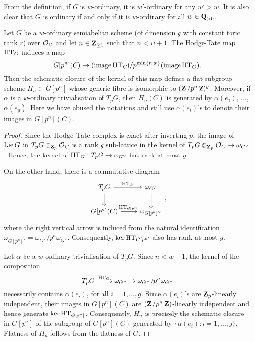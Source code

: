 \begin{Remark}\label{Remark: w-ordinary semiabelian schemes}
\normalfont From the definition, if $G$ is $w$-ordinary, it is $w'$-ordinary for any $w'>w$. It is also clear that $G$ is ordinary if and only if it is $w$-ordinary for all $w\in \operatorname{\mathbf{Q}}_{>0}$.  
\end{Remark}

\begin{Lemma}\label{Lemma: pseudocanonical subgroup}
Let $G$ be a $w$-ordinary semiabelian scheme (of dimension $g$ with constant toric rank $r$) over $\operatorname{\mathcal{O}}_C$ and let $n\in \operatorname{\mathbf{Z}}_{\geq 1}$ such that $n < w+1$. The Hodge-Tate map $\operatorname{HT}_G$ induces a map
$$G[p^n](C) \rightarrow (\operatorname{image}\operatorname{HT}_{G})/p^{\min\{n, w\}} (\operatorname{image} \operatorname{HT}_{G}).
$$ Then the schematic closure of the kernel of this map defines a flat subgroup scheme $H_n \subset G[p^n]$ whose generic fibre is isomorphic to $(\operatorname{\mathbf{Z}}/p^n\operatorname{\mathbf{Z}})^{g}$. Moreover, if $\alpha$ is a $w$-ordinary trivialisation of $T_p G$, then $H_n(C)$ is generated by $\alpha(e_1)$, ..., $\alpha(e_g)$. Here we have abused the notations and still use $\alpha(e_i)$'s to denote their images in $G[p^n](C)$.
\end{Lemma}

\begin{proof}
Since the Hodge--Tate complex is exact after inverting $p$, the image of $\operatorname{Lie} G$ in $T_p G\otimes_{\operatorname{\mathbf{Z}}_p}\operatorname{\mathcal{O}}_C$ is a rank $g$ sub-lattice in the kernel of $T_pG\otimes_{\operatorname{\mathbf{Z}}_p}\operatorname{\mathcal{O}}_C\rightarrow \omega_{G^{\vee}}$. Hence, the kernel of $\operatorname{HT}_{G}: T_p G \rightarrow {\omega}_{G^{\vee}}$ has rank at most $g$.

On the other hand, there is a commutative diagram \[
    \begin{tikzcd}
        T_p G\arrow[d]\arrow[r, "\HT_{G}"] &  {\omega}_{G^{\vee}}\arrow[d]\\
        G[p^n](C)\arrow[r, "\HT_{G[p^n]}"] & {\omega}_{G[p^n]^{\vee}}
    \end{tikzcd},
\] where the right vertical arrow is induced from the natural identification ${\omega}_{G[p^n]^{\vee}} = {\omega}_{G^{\vee}}/p^n{\omega}_{G^{\vee}}$. Consequently, $\ker\operatorname{HT}_{G[p^n]}$ also has rank at most $g$.

Let $\alpha$ be a $w$-ordinary trivialisation of $T_p G$. Since $n<w+1$, the kernel of the composition \[
    T_p G \xrightarrow{\operatorname{HT}_{G}} {\omega}_{G^{\vee}} \rightarrow {\omega}_{G^{\vee}}/p^n{\omega}_{G^{\vee}}
\] necessarily contains $\alpha(e_i)$, for all $i=1, ..., g$. Since $\alpha(e_i)$'s are $\operatorname{\mathbf{Z}}_p$-linearly independent, their images in $G[p^n](C)$ are $(\operatorname{\mathbf{Z}}/p^n\operatorname{\mathbf{Z}})$-linearly independent and hence generate $\ker\operatorname{HT}_{G[p^n]}$. Consequently, $H_n$ is precisely the schematic closure in $G[p^n]$ of the subgroup of $G[p^n](C)$ generated by $\{\alpha(e_i): i=1, ..., g\}$. Flatness of $H_n$ follows from the flatness of $G$.
\end{proof}

